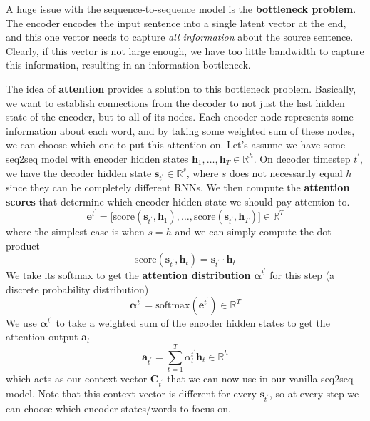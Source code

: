 \documentclass{article}
\theoremstyle{definition}
\theoremstyle{remark}
\theoremstyle{definition}
\begin{document}
A huge issue with the sequence-to-sequence model is the \textbf{bottleneck problem}. The encoder encodes the input sentence into a single latent vector at the end, and this one vector needs to capture \textit{all information} about the source sentence. Clearly, if this vector is not large enough, we have too little bandwidth to capture this information, resulting in an information bottleneck. 

The idea of \textbf{attention} provides a solution to this bottleneck problem. Basically, we want to establish connections from the decoder to not just the last hidden state of the encoder, but to all of its nodes. Each encoder node represents some information about each word, and by taking some weighted sum of these nodes, we can choose which one to put this attention on. Let's assume we have some seq2seq model with encoder hidden states $\mathbf{h}_1, \ldots, \mathbf{h}_T \in \mathbb{R}^h$. On decoder timestep $t^\prime$, we have the decoder hidden state $\mathbf{s}_{t^\prime} \in \mathbb{R}^s$, where $s$ does not necessarily equal $h$ since they can be completely different RNNs. We then compute the \textbf{attention scores} that determine which encoder hidden state we should pay attention to. 
\[\mathbf{e}^{t^\prime} = \big[ \mathrm{score}(\mathbf{s}_{t^\prime}, \mathbf{h}_1 ), \ldots, \mathrm{score}(\mathbf{s}_{t^\prime}, \mathbf{h}_T) \big] \in \mathbb{R}^T\]
where the simplest case is when $s = h$ and we can simply compute the dot product 
\[\mathrm{score} (\mathbf{s}_{t^\prime}, \mathbf{h}_t) = \mathbf{s}_{t^\prime} \cdot \mathbf{h}_t\]
We take its softmax to get the \textbf{attention distribution} $\boldsymbol{\alpha}^{t^\prime}$ for this step (a discrete probability distribution) 
\[\boldsymbol{\alpha}^{t^\prime} = \mathrm{softmax} (\mathbf{e}^{t^\prime}) \in \mathbb{R}^T\]
We use $\boldsymbol{\alpha}^{t^\prime}$ to take a weighted sum of the encoder hidden states to get the attention output $\mathbf{a}_t$ 
\[\mathbf{a}_{t^\prime} = \sum_{t=1}^T \alpha_{t}^{t^\prime} \mathbf{h}_t \in \mathbb{R}^h\]
which acts as our context vector $\mathbf{C}_{t^\prime}$ that we can now use in our vanilla seq2seq model. Note that this context vector is different for every $\mathbf{s}_{t^\prime}$, so at every step we can choose which encoder states/words to focus on.  
\end{document}
